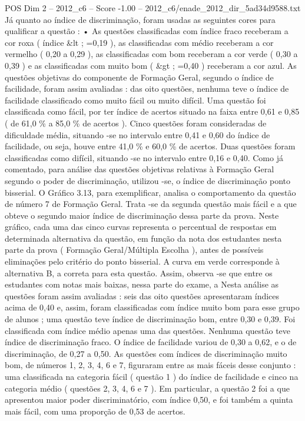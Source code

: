 \begin{textsample}{POS Dim 2 – 2012\_c6 – Score -1.00 – 2012\_c6/enade\_2012\_dir\_5ad34d9588.txt}
Já quanto ao índice de discriminação, foram usadas as seguintes cores para qualificar a questão : • As questões classificadas com índice fraco receberam a cor roxa ( índice \&lt ; =0,19 ), as classificadas com médio receberam a cor vermelho ( 0,20 a 0,29 ), as classificadas com bom receberam a cor verde ( 0,30 a 0,39 ) e as classificadas com muito bom ( \&gt ; =0,40 ) receberam a cor azul.
As questões objetivas do componente de Formação Geral, segundo o índice de facilidade, foram assim avaliadas : das oito questões, nenhuma teve o índice de facilidade classificado como muito fácil ou muito difícil.
Uma questão foi classificada como fácil, por ter índice de acertos situado na faixa entre 0,61 e 0,85 ( de 61,0 \% a 85,0 \% de acertos ).
Cinco questões foram consideradas de dificuldade média, situando -se no intervalo entre 0,41 e 0,60 do índice de facilidade, ou seja, houve entre 41,0 \% e 60,0 \% de acertos.
Duas questões foram classificadas como difícil, situando -se no intervalo entre 0,16 e 0,40.
Como já comentado, para análise das questões objetivas relativas à Formação Geral segundo o poder de discriminação, utilizou -se, o índice de discriminação ponto bisserial.
O Gráfico 3.13, para exemplificar, analisa o comportamento da questão de número 7 de Formação Geral.
Trata -se da segunda questão mais fácil e a que obteve o segundo maior índice de discriminação dessa parte da prova.
Neste gráfico, cada uma das cinco curvas representa o percentual de respostas em determinada alternativa da questão, em função da nota dos estudantes nesta parte da prova ( Formação Geral/Múltipla Escolha ), antes de possíveis eliminações pelo critério do ponto bisserial.
A curva em verde corresponde à alternativa B, a correta para esta questão.
Assim, observa -se que entre os estudantes com notas mais baixas, nessa parte do exame, a Nesta análise as questões foram assim avaliadas : seis das oito questões apresentaram índices acima de 0,40 e, assim, foram classificadas com índice muito bom para esse grupo de alunos ; uma questão teve índice de discriminação bom, entre 0,30 e 0,39.
Foi classificada com índice médio apenas uma das questões.
Nenhuma questão teve índice de discriminação fraco.
O índice de facilidade variou de 0,30 a 0,62, e o de discriminação, de 0,27 a 0,50.
As questões com índices de discriminação muito bom, de números 1, 2, 3, 4, 6 e 7, figuraram entre as mais fáceis desse conjunto : uma classificada na categoria fácil ( questão 1 ) do índice de facilidade e cinco na categoria médio ( questões 2, 3, 4, 6 e 7 ).
Em particular, a questão 2 foi a que apresentou maior poder discriminatório, com índice 0,50, e foi também a quinta mais fácil, com uma proporção de 0,53 de acertos.

\end{textsample}

